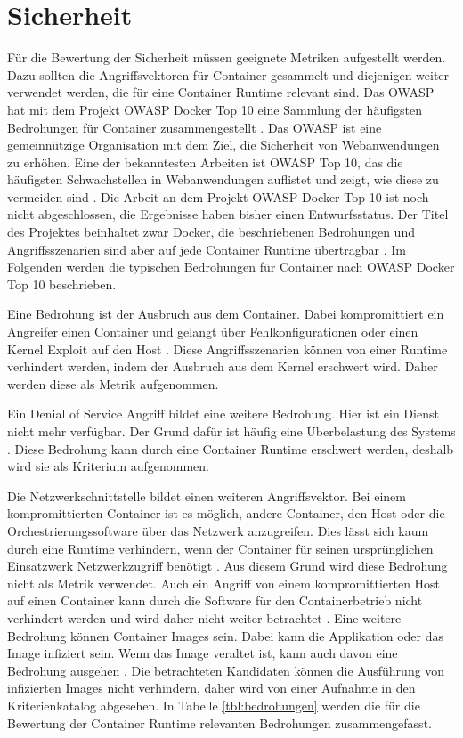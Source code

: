 \section{Sicherheit}
\label{sec:sicherheit_kriterien}
Für die Bewertung der Sicherheit müssen geeignete Metriken aufgestellt werden. Dazu sollten die Angriffsvektoren für Container gesammelt und diejenigen weiter verwendet werden, die für eine Container Runtime relevant sind. Das \ac{OWASP} \cite[vgl.][]{OWASP.2020} hat mit dem Projekt \ac{OWASP} Docker Top 10 eine Sammlung der häufigsten Bedrohungen für Container zusammengestellt \cite[vgl.][]{DirkWetter.20181218}. Das \ac{OWASP} ist eine gemeinnützige Organisation mit dem Ziel, die Sicherheit von Webanwendungen zu erhöhen. Eine der bekanntesten Arbeiten ist \ac{OWASP} Top 10, das die häufigsten Schwachstellen in Webanwendungen auflistet und zeigt, wie diese zu vermeiden sind  \cite[vgl.][]{OWASP.2018}. Die Arbeit an dem Projekt \ac{OWASP} Docker Top 10 ist noch nicht abgeschlossen, die Ergebnisse haben bisher einen Entwurfsstatus. Der Titel des Projektes beinhaltet zwar Docker, die beschriebenen Bedrohungen und Angriffsszenarien sind aber auf jede Container Runtime übertragbar  \cite[vgl.][]{DirkWetter.20181218}. Im Folgenden werden die typischen Bedrohungen für Container nach \ac{OWASP} Docker Top 10 beschrieben. 

Eine Bedrohung ist der Ausbruch aus dem Container. Dabei kompromittiert ein Angreifer einen Container und gelangt über Fehlkonfigurationen oder einen Kernel Exploit auf den Host \cite[vgl.][4, 7, 10]{OWASP.2019}. Diese Angriffsszenarien können von einer Runtime verhindert werden, indem der Ausbruch aus dem Kernel erschwert wird. Daher werden diese als Metrik aufgenommen.

Ein Denial of Service Angriff bildet eine weitere Bedrohung. Hier ist ein Dienst nicht mehr verfügbar. Der Grund dafür ist häufig eine Überbelastung des Systems  \cite[vgl.][5, 18]{OWASP.2019}. Diese Bedrohung kann durch eine Container Runtime erschwert werden, deshalb wird sie als Kriterium aufgenommen.

Die Netzwerkschnittstelle bildet einen weiteren Angriffsvektor. Bei einem kompromittierten Container ist es möglich, andere Container, den Host oder die Orchestrierungssoftware über das Netzwerk anzugreifen. Dies lässt sich kaum durch eine Runtime verhindern, wenn der Container für seinen ursprünglichen Einsatzwerk Netzwerkzugriff benötigt \cite[vgl.][]{DirkWetter.2019}. Aus diesem Grund wird diese Bedrohung nicht als Metrik verwendet.
Auch ein Angriff von einem kompromittierten Host auf einen Container kann durch die Software für den Containerbetrieb nicht verhindert werden und wird daher nicht weiter betrachtet \cite[vgl.][5, 9]{OWASP.2019}.
Eine weitere Bedrohung können Container Images sein. Dabei kann die Applikation oder das Image infiziert sein. Wenn das Image veraltet ist, kann auch davon eine Bedrohung ausgehen \cite[vgl.][5]{OWASP.2019}. Die betrachteten Kandidaten können die Ausführung von infizierten Images nicht verhindern, daher wird von einer Aufnahme in den Kriterienkatalog abgesehen. 
In Tabelle \ref{tbl:bedrohungen} werden die für die Bewertung der Container Runtime relevanten Bedrohungen zusammengefasst.

